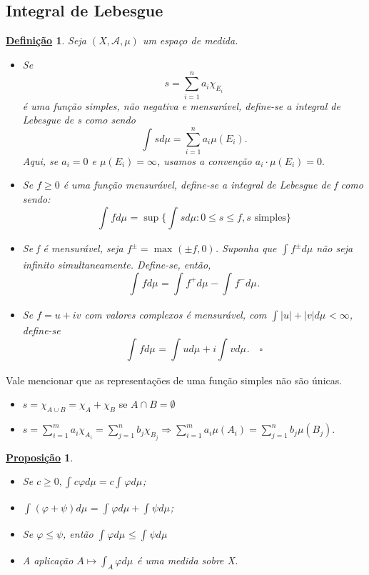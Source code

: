 \documentclass{article}
\newtheorem*{def*}{\underline{Defini\c c\~ao}}
\newtheorem*{prop*}{\underline{Proposi\c c\~ao}}
\begin{document}
\subsection{Integral de Lebesgue}
\begin{def*}
  Seja \((X, \mathcal{A}, \mu )\) um espaço de medida. 
 \begin{itemize}
   \item[1)] Se 
     \[
       s=\sum\limits_{i=1}^{n}a_{i}\chi_{E_{i}}
     \]
     é uma função simples, não negativa e mensurável, define-se a integral de Lebesgue de s como sendo 
       \[
         \int_{}^{}sd\mu = \sum\limits_{i=1}^{n}a_{i}\mu (E_{i}).
       \]
      Aqui, se \(a_{i} = 0\) e \(\mu (E_{i}) = \infty\), usamos a convenção \(a_{i}\cdot \mu (E_{i}) =0.\)
  \item[2)] Se \(f\geq 0\) é uma função mensurável, define-se a integral de Lebesgue de f como sendo:
    \[
      \int_{}f d\mu_{} = \sup_{}\biggl\{\int_{}^{}s d\mu : 0 \leq s\leq f, s \text{ simples}\biggr\}
    \]
  \item[3)] Se f é mensurável, seja \(f^{\pm} = \max_{}(\pm f, 0)\). Suponha que \(\int_{}^{}f^{\pm}d\mu \) não seja infinito simultaneamente. Define-se, então, 
    \[
      \int_{}f d\mu_{} = \int_{}f^{+} d\mu_{} - \int_{}f^{-} d\mu_{}.
    \]
  \item[4)] Se \(f = u + iv\) com valores complexos é mensurável, com \(\int_{}|u|+|v| d\mu_{} < \infty\), define-se
    \[
      \int_{}f d\mu_{} = \int_{}u d\mu_{} + i\int_{}v d\mu_{}. \quad \square
    \]
 \end{itemize}
\end{def*}
  Vale mencionar que as representações de uma função simples não são únicas.
 \begin{itemize}
   \item \(s = \chi_{A\cup B} = \chi_{A} + \chi_{B}\) se \(A\cap B = \emptyset \)
   \item \(s = \sum\limits_{i=1}^{m}a_{i}\chi_{A_{i}} = \sum\limits_{j=1}^{n}b_{j}\chi_{B_{j}} \Rightarrow \sum\limits_{i=1}^{m}a_{i}\mu (A_{i}) = \sum\limits_{j=1}^{n}b_{j}\mu (B_{j})\).
 \end{itemize}
 \begin{prop*}
  \begin{itemize}
    \item[1)] Se \(c\geq 0, \int_{}^{}c\varphi d\mu  = c\int_{}\varphi  d\mu_{}\);
      \item[2)] \(\int_{}(\varphi + \psi) d\mu_{} = \int_{}^{}\varphi d\mu + \int_{}\psi d\mu_{}\);
        \item[3)] Se \(\varphi \leq \psi\), então \(\int_{}\varphi  d\mu_{} \leq \int_{}\psi d\mu_{}\)
          \item[4)] A aplicação \(A\mapsto \int_{A}\varphi  d\mu_{}\) é uma medida sobre X. 
  \end{itemize}
 \end{prop*}
\end{document}
